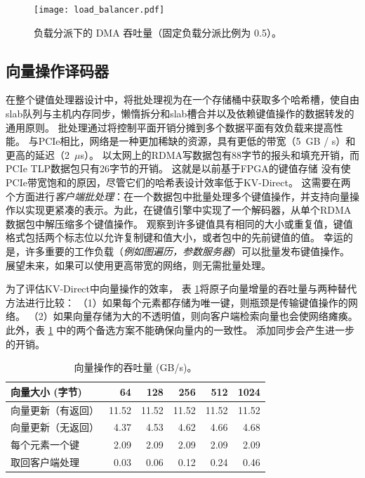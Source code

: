 \begin{figure}[htbp]
	\centering
	{\texttt{[image: load\_balancer.pdf]}}
	\caption{负载分派下的 DMA 吞吐量（固定负载分派比例为 0.5）。}
	\label{kvdirect:fig:cache-tput}
\end{figure}



\subsection{向量操作译码器}

在整个键值处理器设计中，将批处理视为在一个存储桶中获取多个哈希槽，使自由slab队列与主机内存同步，懒惰拆分和slab槽合并以及依赖键值操作的数据转发的通用原则。
批处理通过将控制平面开销分摊到多个数据平面有效负载来提高性能。
与PCIe相比，网络是一种更加稀缺的资源，具有更低的带宽（5~GB / s）和更高的延迟（2~$\mu$s）。
以太网上的RDMA写数据包有88字节的报头和填充开销，而PCIe TLP数据包只有26字节的开销。
这就是以前基于FPGA的键值存储 \cite{blott13hotcloud,blott2015scaling} 没有使PCIe带宽饱和的原因，尽管它们的哈希表设计效率低于KV-Direct。
这需要在两个方面进行\textit {客户端批处理}：在一个数据包中批量处理多个键值操作，并支持向量操作以实现更紧凑的表示。为此，在键值引擎中实现了一个解码器，从单个RDMA数据包中解压缩多个键值操作。
观察到许多键值具有相同的大小或重复值，键值格式包括两个标志位以允许复制键和值大小，或者包中的先前键值的值。
幸运的是，许多重要的工作负载（\textit {例如图遍历，参数服务器}）可以批量发布键值操作。
展望未来，如果可以使用更高带宽的网络，则无需批量处理。


为了评估KV-Direct中向量操作的效率，
表 \ref {kvdirect:tab:vec_throughput}将原子向量增量的吞吐量与两种替代方法进行比较：
（1）如果每个元素都存储为唯一键，则瓶颈是传输键值操作的网络。
（2）如果向量存储为大的不透明值，则向客户端检索向量也会使网络瘫痪。
此外，表 \ref {kvdirect:tab:vec_throughput} 中的两个备选方案不能确保向量内的一致性。 添加同步会产生进一步的开销。


\begin{table}[htbp]
	\centering
	\caption{向量操作的吞吐量 (GB/s)。}
	\label{kvdirect:tab:vec_throughput}
	\small
		\begin{tabular}{|l|r|r|r|r|r|}
			\hline
			向量大小 (字节)              & 64    & 128   & 256   & 512   & 1024  \\ \hline
			向量更新（有返回）    & 11.52 & 11.52 & 11.52 & 11.52 & 11.52 \\ \hline
			向量更新（无返回） & 4.37  & 4.53  & 4.62  & 4.66  & 4.68  \\ \hline
			每个元素一个键         & 2.09  & 2.09  & 2.09  & 2.09  & 2.09  \\ \hline
			取回客户端处理             & 0.03  & 0.06  & 0.12  & 0.24  & 0.46  \\ \hline
		\end{tabular}
\end{table}




